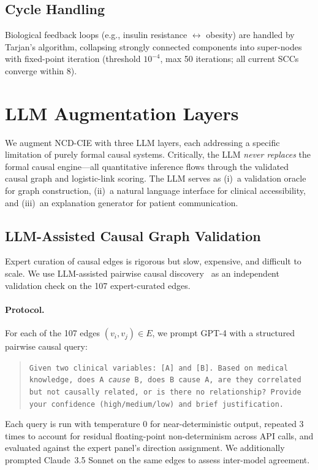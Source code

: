 \documentclass[runningheads]{llncs}
\begin{document}
\subsection{Cycle Handling}\label{sec:cycles}

Biological feedback loops (e.g., insulin resistance
$\leftrightarrow$ obesity) are handled by Tarjan's algorithm,
collapsing strongly connected components into super-nodes with
fixed-point iteration (threshold $10^{-4}$, max 50 iterations;
all current SCCs converge within 8).

\section{LLM Augmentation Layers}\label{sec:llm}

We augment NCD-CIE with three LLM layers, each addressing a
specific limitation of purely formal causal systems.
Critically, the LLM \emph{never replaces} the formal causal
engine---all quantitative inference flows through the
validated causal graph and logistic-link scoring.
The LLM serves as (i)~a validation oracle for graph construction,
(ii)~a natural language interface for clinical accessibility, and
(iii)~an explanation generator for patient communication.

\subsection{LLM-Assisted Causal Graph Validation}\label{sec:llmvalidation}

Expert curation of causal edges is rigorous but slow, expensive,
and difficult to scale.
We use LLM-assisted pairwise causal discovery~\cite{kiciman2023causal}
as an independent validation check on the 107 expert-curated edges.

\paragraph{Protocol.}
For each of the 107 edges $(v_i, v_j) \in E$, we prompt GPT-4
with a structured pairwise causal query:
\begin{quote}
\small\texttt{Given two clinical variables: [A] and [B].
Based on medical knowledge, does A \emph{cause} B, does B cause A,
are they correlated but not causally related, or is there no
relationship? Provide your confidence (high/medium/low) and
brief justification.}
\end{quote}
Each query is run with temperature 0 for near-deterministic output,
repeated 3 times to account for residual floating-point
non-determinism across API calls, and evaluated against the expert
panel's direction assignment.
We additionally prompted Claude~3.5 Sonnet on the same edges to
assess inter-model agreement.
\end{document}

